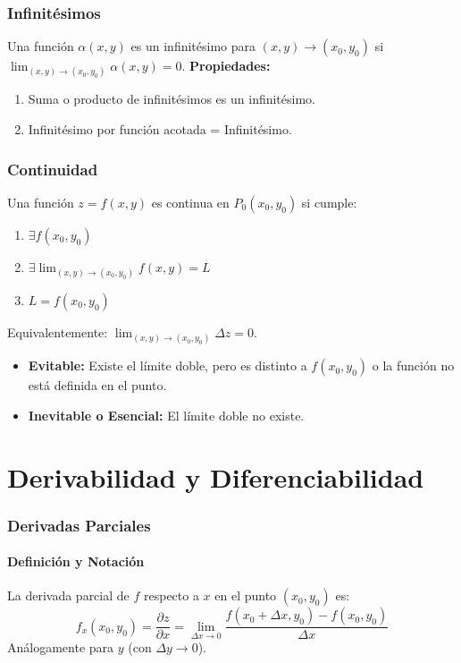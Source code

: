 \documentclass[a4paper,12pt]{article}
\begin{document}
\section{Infinitésimos}
Una función $\alpha(x,y)$ es un infinitésimo para $(x,y) \to (x_0,y_0)$ si $\lim_{(x,y) \to (x_0,y_0)} \alpha(x,y) = 0$.
\textbf{Propiedades:}
\begin{enumerate}
    \item Suma o producto de infinitésimos es un infinitésimo.
    \item Infinitésimo por función acotada = Infinitésimo.
\end{enumerate}

\section{Continuidad}
Una función $z = f(x,y)$ es continua en $P_0(x_0,y_0)$ si cumple:
\begin{enumerate}
    \item $\exists f(x_0,y_0)$
    \item $\exists \lim_{(x,y) \to (x_0,y_0)} f(x,y) = L$
    \item $L = f(x_0,y_0)$
\end{enumerate}

Equivalentemente: $\lim_{(x,y) \to (x_0,y_0)} \Delta z = 0$.

\begin{tcolorbox}[title=Clasificación de Discontinuidades,colback=blue!5!white,colframe=blue!75!black]
    \begin{itemize}
        \item \textbf{Evitable:} Existe el límite doble, pero es distinto a $f(x_0,y_0)$ o la función no está definida en el punto.
        \item \textbf{Inevitable o Esencial:} El límite doble no existe.
    \end{itemize}
\end{tcolorbox}

\newpage
\part{Derivabilidad y Diferenciabilidad}

\section{Derivadas Parciales}
\subsection{Definición y Notación}
La derivada parcial de $f$ respecto a $x$ en el punto $(x_0,y_0)$ es:
$$ f_x(x_0,y_0) = \frac{\partial z}{\partial x} = \lim_{\Delta x \to 0} \frac{f(x_0+\Delta x, y_0) - f(x_0, y_0)}{\Delta x} $$
Análogamente para $y$ (con $\Delta y \to 0$).
\end{document}

